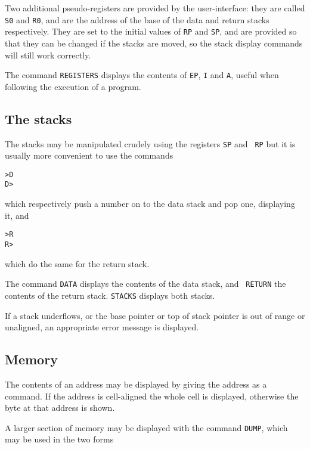 Two additional pseudo-registers are provided by the user-interface: they are
called {\tt S0} and {\tt R0}, and are the address of the base of the data and
return stacks respectively. They are set to the initial values of {\tt RP}
and {\tt SP}, and are provided so that they can be changed if the stacks are
moved, so the stack display commands will still work correctly.

The command {\tt REGISTERS} displays the contents of {\tt EP}, {\tt I} and
{\tt A}, useful when following the execution of a program.

\subsection{The stacks}

The stacks may be manipulated crudely using the registers {\tt SP} and {\tt
RP} but it is usually more convenient to use the commands

\begin{center}
{\tt >D} \\
{\tt D>}
\end{center}

which respectively push a number on to the data stack and pop one, displaying
it, and

\begin{center}
{\tt >R} \\
{\tt R>}
\end{center}

which do the same for the return stack.

The command {\tt DATA} displays the contents of the data stack, and {\tt
RETURN} the contents of the return stack. {\tt STACKS} displays both stacks.

If a stack underflows, or the base pointer or top of stack pointer is out of
range or unaligned, an appropriate error message is displayed.

\subsection{Memory}

The contents of an address may be displayed by giving the address as a
command. If the address is cell-aligned the whole cell is displayed,
otherwise the byte at that address is shown.

A larger section of memory may be displayed with the command {\tt DUMP},
which may be used in the two forms

